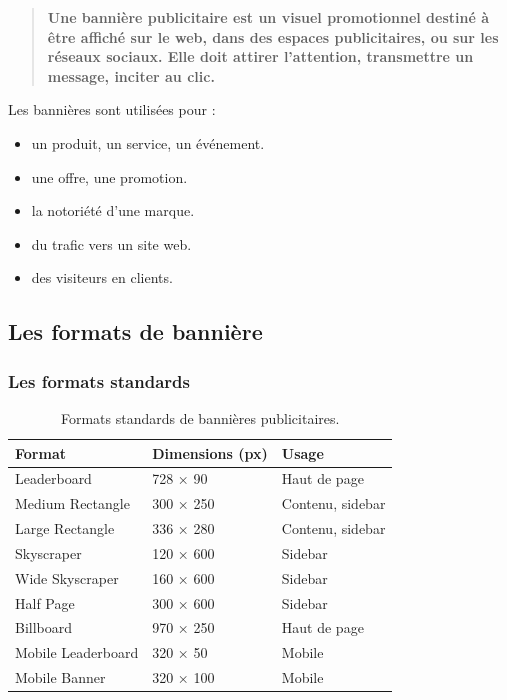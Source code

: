 \begin{quote}
\textbf{Une bannière publicitaire est un visuel promotionnel destiné à être affiché sur le web, dans des espaces publicitaires, ou sur les réseaux sociaux. Elle doit attirer l'attention, transmettre un message, inciter au clic.}
\end{quote}

Les bannières sont utilisées pour :

\begin{itemize}
    \item {} un produit, un service, un événement.
    \item {} une offre, une promotion.
    \item {} la notoriété d'une marque.
    \item {} du trafic vers un site web.
    \item {} des visiteurs en clients.
\end{itemize}

\subsection{Les formats de bannière}

\subsubsection{Les formats standards}

\begin{table}[h!]
\centering
\begin{tabular}{@{}p{4cm}p{4cm}p{5cm}@{}}
\toprule
\textbf{Format} & \textbf{Dimensions (px)} & \textbf{Usage} \\
\midrule
Leaderboard & 728 × 90 & Haut de page \\
Medium Rectangle & 300 × 250 & Contenu, sidebar \\
Large Rectangle & 336 × 280 & Contenu, sidebar \\
Skyscraper & 120 × 600 & Sidebar \\
Wide Skyscraper & 160 × 600 & Sidebar \\
Half Page & 300 × 600 & Sidebar \\
Billboard & 970 × 250 & Haut de page \\
Mobile Leaderboard & 320 × 50 & Mobile \\
Mobile Banner & 320 × 100 & Mobile \\
\bottomrule
\end{tabular}
\caption{Formats standards de bannières publicitaires.}
\end{table}

